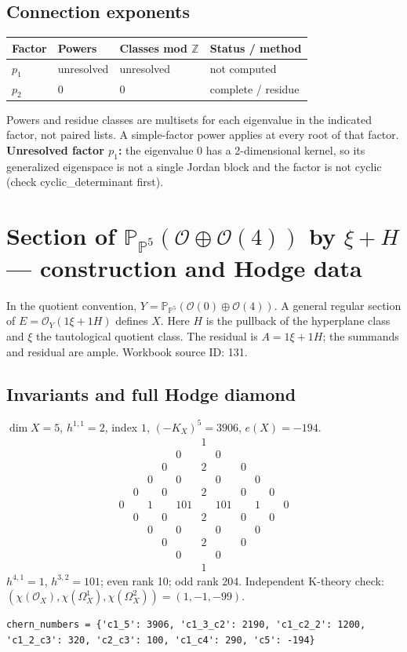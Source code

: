 \documentclass[10pt,a4paper]{article}
\begin{document}
\subsection*{Connection exponents}
\begin{center}\begin{tabular}{llll}\toprule Factor & Powers & Classes mod $\mathbb Z$ & Status / method\\\midrule
$p_{1}$ & unresolved & unresolved & not computed\\
$p_{2}$ & $0$ & $0$ & complete / residue\\
\bottomrule\end{tabular}\end{center}
Powers and residue classes are multisets for each eigenvalue in the indicated factor, not paired lists. A simple-factor power applies at every root of that factor.
\textbf{Unresolved factor $p_{1}$:} the eigenvalue 0 has a 2-dimensional kernel, so its generalized eigenspace is not a single Jordan block and the factor is not cyclic (check cyclic\_determinant first).
\clearpage\section*{Section of $\mathbb P_{\mathbb P^{5}}(\mathcal O\oplus \mathcal O(4))$ by $\xi +H$ --- construction and Hodge data}\label{entry:PB5-131}
In the quotient convention, $Y=\mathbb P_{\mathbb P^{5}}(\mathcal O(0)\oplus\mathcal O(4))$.
A general regular section of $E=\mathcal O_Y(1\xi+1H)$ defines $X$.
Here $H$ is the pullback of the hyperplane class and $\xi$ the tautological quotient class. The residual is $A=1\xi+1H$; the summands and residual are ample.
Workbook source ID: 131.
\subsection*{Invariants and full Hodge diamond}
$\dim X=5$, $h^{1,1}=2$, index $1$, $(-K_X)^5=3906$, $e(X)=-194$.
\[\begin{array}{ccccccccccc}&&&&&1&&&&&\\&&&&0&&0&&&&\\&&&0&&2&&0&&&\\&&0&&0&&0&&0&&\\&0&&0&&2&&0&&0&\\0&&1&&101&&101&&1&&0\\&0&&0&&2&&0&&0&\\&&0&&0&&0&&0&&\\&&&0&&2&&0&&&\\&&&&0&&0&&&&\\&&&&&1&&&&&\end{array}\]
$h^{4,1}=1$, $h^{3,2}=101$; even rank 10; odd rank 204.
Independent K-theory check: $(\chi(\mathcal O_X),\chi(\Omega_X^1),\chi(\Omega_X^2))=(1, -1, -99)$.
\begin{lstlisting}
chern_numbers = {'c1_5': 3906, 'c1_3_c2': 2190, 'c1_c2_2': 1200, 'c1_2_c3': 320, 'c2_c3': 100, 'c1_c4': 290, 'c5': -194}
\end{lstlisting}
\end{document}
